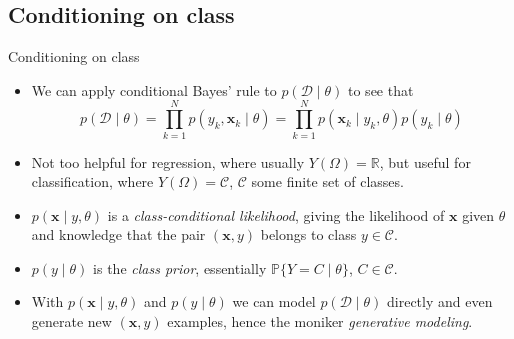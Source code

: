 \documentclass{beamer}
\numberwithin{equation}{section}
\begin{document}
\subsection{Conditioning on class}

\begin{frame}{Conditioning on class}
    \begin{itemize}
        \item
        We can apply conditional Bayes' rule to $ p(\mathcal{D} \mid \theta) $
        to see that
        \begin{equation*}
            p(\mathcal{D} \mid \theta) =
            \prod_{k = 1}^Np(y_k, \mathbf{x}_k \mid \theta) =
            \prod_{k = 1}^Np(\mathbf{x}_k \mid y_k, \theta)p(y_k \mid \theta)
        \end{equation*}

        \item
        Not too helpful for regression, where usually
        $ Y(\Omega) = \mathbb{R} $, but useful for classification, where
        $ Y(\Omega) = \mathcal{C} $, $ \mathcal{C} $ some finite set of
        classes.

        \item
        $ p(\mathbf{x} \mid y, \theta) $ is a \textit{class-conditional
        likelihood}, giving the likelihood of $ \mathbf{x} $ given $ \theta $
        and knowledge that the pair $ (\mathbf{x}, y) $ belongs to class
        $ y \in \mathcal{C} $.

        \item
        $ p(y \mid \theta) $ is the \textit{class prior}, essentially
        $ \mathbb{P}\{Y = C \mid \theta\} $, $ C \in \mathcal{C} $.

        \item
        With $ p(\mathbf{x} \mid y, \theta) $ and $ p(y \mid \theta) $
        we can model $ p(\mathcal{D} \mid \theta) $ directly and even generate
        new $ (\mathbf{x}, y) $ examples, hence the moniker
        \textit{generative modeling}.
    \end{itemize}
\end{frame}
\end{document}
